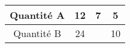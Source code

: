 \begin{tabular}{|c|c|c|c|}
\hline
Quantité A & 12 & 7 & 5 \\ \hline
Quantité B & 24 & \kern1cm & 10 \\ \hline
\end{tabular}

